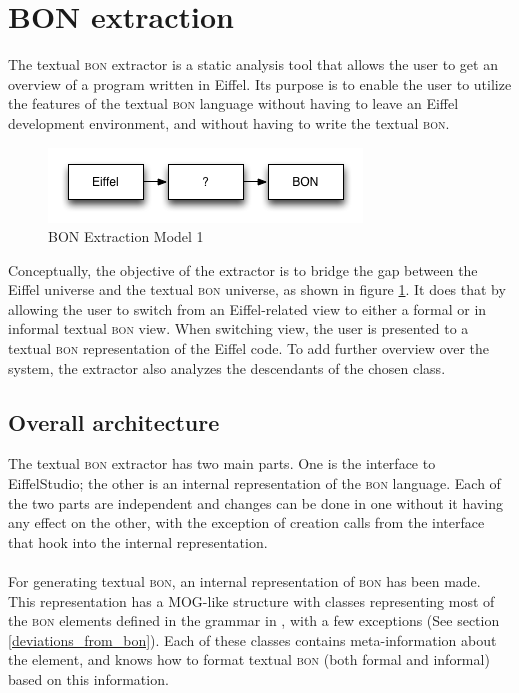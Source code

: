 \section{BON extraction}
The textual \textsc{bon} extractor is a static analysis tool that allows the user to get an overview of a program written in Eiffel. Its purpose is to enable the user to utilize the features of the textual \textsc{bon} language without having to leave an Eiffel development environment, and without having to write the textual \textsc{bon}.
\begin{figure}[H]
\centering
\includegraphics[scale=0.8]{images/BON-extraction-model-1.png}
\caption{BON Extraction Model 1}
\label{fig:bon_extraction_1}
\end{figure}
Conceptually, the objective of the extractor is to bridge the gap between the Eiffel universe and the textual \textsc{bon} universe, as shown in figure \ref{fig:bon_extraction_1}. It does that by allowing the user to switch from an Eiffel-related view to either a formal or in informal textual \textsc{bon} view. When switching view, the user is presented to a textual \textsc{bon} representation of the Eiffel code. To add further overview over the system, the extractor also analyzes the descendants of the chosen class.

\subsection{Overall architecture}
The textual \textsc{bon} extractor has two main parts. One is the interface to EiffelStudio; the other is an internal representation of the \textsc{bon} language. Each of the two parts are independent and changes can be done in one without it having any effect on the other, with the exception of creation calls from the interface that hook into the internal representation.

\paragraph{}
For generating textual \textsc{bon},  an internal representation of \textsc{bon} has been made. This representation has a MOG-like structure with classes representing most of the \textsc{bon} elements defined in the grammar in \cite{walden1995}, with a few exceptions (See section \ref{deviations_from_bon}).  Each of these classes contains meta-information about the element, and knows how to format textual \textsc{bon} (both formal and informal) based on this information.

